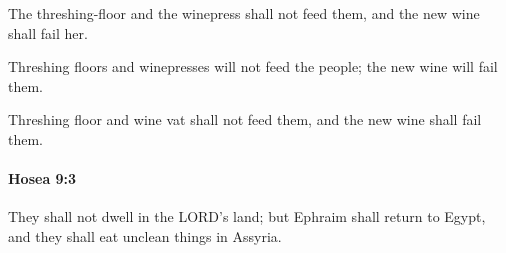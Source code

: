 			\begin{versebox}
					\item[BHS] 
					\item[LXX] 
					\item[ASV] The threshing-floor and the winepress shall not feed them, and the new wine shall fail her.
					\item[NIV] Threshing floors and winepresses will not feed the people; the new wine will fail them.
					\item[NRSV] Threshing floor and wine vat shall not feed them, and the new wine shall fail them.
			\end{versebox}

		\paragraph{Hosea 9:3} %
			\label{HOSEA-9-3}

			They shall not dwell in the LORD’s land; but Ephraim shall return to Egypt, and they shall eat unclean things in Assyria.

